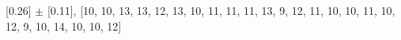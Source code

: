 
[0.26] $\pm$ [0.11], [10, 10, 13, 13, 12, 13, 10, 11, 11, 11, 13, 9, 12, 11, 10, 10, 11, 10, 12, 9, 10, 14, 10, 10, 12]\\
    